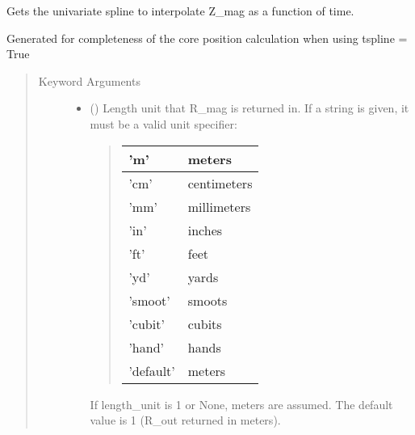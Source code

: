 \documentclass[letterpaper,10pt,english]{sphinxmanual}
\begin{document}
\begin{fulllineitems}

\begin{fulllineitems}
\label{\detokenize{eqtools:eqtools.core.Equilibrium.getMagZSpline}}
Gets the univariate spline to interpolate Z\_mag as a function of time.

Generated for completeness of the core position calculation when using
tspline = True
\begin{quote}\begin{description}
\item[{Keyword Arguments}] \leavevmode\begin{itemize}
\item {} 
 () \textendash{} 
Length unit that R\_mag is returned in. If
a string is given, it must be a valid unit specifier:
\begin{quote}


\begin{savenotes}\sphinxattablestart
\centering
\begin{tabulary}{\linewidth}[t]{|T|T|}
\hline

’m’
&
meters
\\
\hline
’cm’
&
centimeters
\\
\hline
’mm’
&
millimeters
\\
\hline
’in’
&
inches
\\
\hline
’ft’
&
feet
\\
\hline
’yd’
&
yards
\\
\hline
’smoot’
&
smoots
\\
\hline
’cubit’
&
cubits
\\
\hline
’hand’
&
hands
\\
\hline
’default’
&
meters
\\
\hline
\end{tabulary}
\par
\sphinxattableend\end{savenotes}
\end{quote}

If length\_unit is 1 or None, meters are assumed. The default
value is 1 (R\_out returned in meters).



\end{itemize}
\end{description}
\end{quote}
\end{fulllineitems}
\end{fulllineitems}
\end{document}
